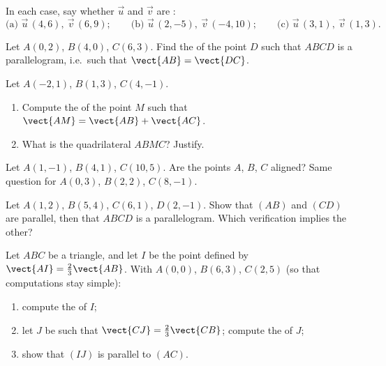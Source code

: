 \begin{exercise}[$\star$]\label{exo:g10:vectors:4}
In each case, say whether $\vec u$ and $\vec v$ are :
\[
\text{(a) } \vec u\,(4, 6),\ \vec v\,(6, 9);
\qquad
\text{(b) } \vec u\,(2, -5),\ \vec v\,(-4, 10);
\qquad
\text{(c) } \vec u\,(3, 1),\ \vec v\,(1, 3).
\]
\end{exercise}

\begin{exercise}[$\star$]\label{exo:g10:vectors:5}
Let $A(0, 2)$, $B(4, 0)$, $C(6, 3)$. Find the  of the point
$D$ such that $ABCD$ is a parallelogram, i.e.\ such that
$\vect{AB} = \vect{DC}$.
\end{exercise}

\begin{exercise}[$\star\star$]\label{exo:g10:vectors:6}
Let $A(-2, 1)$, $B(1, 3)$, $C(4, -1)$.
\begin{enumerate}
  \item Compute the  of the point $M$ such that
        $\vect{AM} = \vect{AB} + \vect{AC}$.
  \item What is the quadrilateral $ABMC$? Justify.
\end{enumerate}
\end{exercise}

\begin{exercise}[$\star\star$]\label{exo:g10:vectors:7}
Let $A(1, -1)$, $B(4, 1)$, $C(10, 5)$. Are the points $A$, $B$, $C$
aligned? Same question for $A(0, 3)$, $B(2, 2)$, $C(8, -1)$.
\end{exercise}

\begin{exercise}[$\star\star$]\label{exo:g10:vectors:8}
Let $A(1, 2)$, $B(5, 4)$, $C(6, 1)$, $D(2, -1)$. Show that $(AB)$ and
$(CD)$ are parallel, then that $ABCD$ is a parallelogram. Which
verification implies the other?
\end{exercise}

\begin{exercise}[$\star\star$]\label{exo:g10:vectors:9}
Let $ABC$ be a triangle, and let $I$ be the point defined by
$\vect{AI} = \frac23 \vect{AB}$. With $A(0,0)$, $B(6, 3)$, $C(2, 5)$
(so that computations stay simple):
\begin{enumerate}
  \item compute the  of $I$;
  \item let $J$ be such that $\vect{CJ} = \frac23\vect{CB}$; compute the
         of $J$;
  \item show that $(IJ)$ is parallel to $(AC)$.
\end{enumerate}
\end{exercise}

